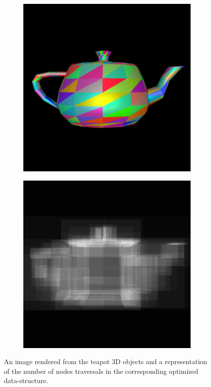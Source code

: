 \documentclass[acmsmall]{acmart}
\begin{document}
\begin{figure}[h]
    \centering
    
\begin{subfigure}{.5\textwidth}
  \centering
  \includegraphics[width=.9\linewidth]{img/teapot.png}
\end{subfigure}%
\begin{subfigure}{.5\textwidth}
  \centering
  \includegraphics[width=.9\linewidth]{img/tbteapot.png}
\end{subfigure}    
    
    \caption{An image rendered from the teapot 3D objects and a representation of the number of nodes traversals in the corresponding optimized data-structure.}
    \label{fig:dsteapot}
\end{figure}
\end{document}
